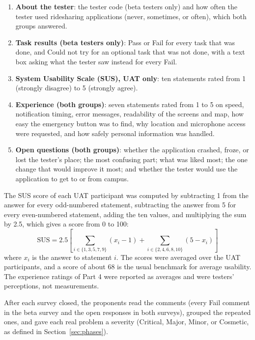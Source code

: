 \begin{enumerate}
    \item \textbf{About the tester}: the tester code (beta testers only) and how often the tester used ridesharing applications (never, sometimes, or often), which both groups answered.
    \item \textbf{Task results (beta testers only)}: Pass or Fail for every task that was done, and Could not try for an optional task that was not done, with a text box asking what the tester saw instead for every Fail.
    \item \textbf{System Usability Scale (SUS), UAT only}: ten statements rated from 1 (strongly disagree) to 5 (strongly agree).
    \item \textbf{Experience (both groups)}: seven statements rated from 1 to 5 on speed, notification timing, error messages, readability of the screens and map, how easy the emergency button was to find, why location and microphone access were requested, and how safely personal information was handled.
    \item \textbf{Open questions (both groups)}: whether the application crashed, froze, or lost the tester's place; the most confusing part; what was liked most; the one change that would improve it most; and whether the tester would use the application to get to or from campus.
\end{enumerate}

The SUS score of each UAT participant was computed by subtracting 1 from the answer for every odd-numbered statement, subtracting the answer from 5 for every even-numbered statement, adding the ten values, and multiplying the sum by 2.5, which gives a score from 0 to 100:
\begin{equation}
    \text{SUS} = 2.5 \left[ \sum_{i \in \{1,3,5,7,9\}} (x_i - 1) + \sum_{i \in \{2,4,6,8,10\}} (5 - x_i) \right]
\end{equation}
where $x_i$ is the answer to statement $i$. The scores were averaged over the UAT participants, and a score of about 68 is the usual benchmark for average usability. The experience ratings of Part 4 were reported as averages and were testers' perceptions, not measurements.

After each survey closed, the proponents read the comments (every Fail comment in the beta survey and the open responses in both surveys), grouped the repeated ones, and gave each real problem a severity (Critical, Major, Minor, or Cosmetic, as defined in Section~\ref{sec:phases}).

